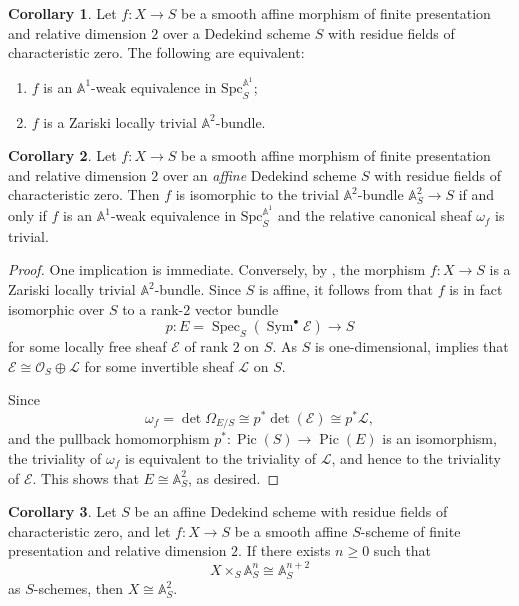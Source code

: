 \documentclass[10pt]{amsart}
\renewcommand{\AA}{\mathbb{A}}
\newcommand{\Spec}{\operatorname{Spec}}
\DeclareMathOperator{\Sym}{Sym}
\numberwithin{equation}{section} %
\theoremstyle{plain}
\theoremstyle{definition}
\newtheorem{corollary}[corollary]{Corollary}
\theoremstyle{remark}
\newcommand{\Pic}{\operatorname{Pic}}
\begin{document}
\begin{corollary}\label{2-dim DD}
Let $f:X\to S$ be a smooth affine morphism of finite presentation and relative dimension $2$ over a Dedekind scheme $S$ with residue fields of characteristic zero. The following are equivalent:
\begin{enumerate}
    \item $f$ is an $\AA^1$-weak equivalence in $\mathrm{Spc}_S^{\AA^1}$;
    \item $f$ is a Zariski locally trivial $\AA^2$-bundle.
\end{enumerate}
\end{corollary}

\begin{corollary}\label{A2unique:DD}
Let $f:X\to S$ be a smooth affine morphism of finite presentation and relative dimension $2$ over an \emph{affine} Dedekind scheme $S$ with residue fields of characteristic zero. Then $f$ is isomorphic to the trivial $\AA^2$-bundle $\AA^2_S\to S$ if and only if $f$ is an $\AA^1$-weak equivalence in $\mathrm{Spc}_S^{\AA^1}$ and the relative canonical sheaf $\omega_f$ is trivial.
\end{corollary}


\begin{proof}
One implication is immediate. Conversely, by , the morphism $f:X\to S$ is a Zariski locally trivial $\AA^2$-bundle. Since $S$ is affine, it follows from \cite[Theorem~4.9]{BCW76} that $f$ is in fact isomorphic over $S$ to a rank-$2$ vector bundle
\[
p:E=\Spec_S(\Sym^{\bullet}\mathcal{E})\to S
\]
for some locally free sheaf $\mathcal{E}$ of rank $2$ on $S$. As $S$ is one-dimensional, \cite[Theorem~1]{SerreModulesprojectifs} implies that $\mathcal{E}\cong \mathcal{O}_S\oplus \mathcal{L}$ for some invertible sheaf $\mathcal{L}$ on $S$.

Since
\[
\omega_f=\det \Omega_{E/S}\cong p^*\det(\mathcal{E})\cong p^*\mathcal{L},
\]
and the pullback homomorphism $p^*:\Pic(S)\to \Pic(E)$ is an isomorphism, the triviality of $\omega_f$ is equivalent to the triviality of $\mathcal{L}$, and hence to the triviality of $\mathcal{E}$. This shows that $E\cong \AA^2_S$, as desired.
\end{proof}

\begin{corollary}\label{cor:cancel-rel-2}
Let $S$ be an affine Dedekind scheme with residue fields of characteristic zero, and let $f:X\to S$ be a smooth affine $S$-scheme of finite presentation and relative dimension $2$. If there exists $n\geq 0$ such that
\[
X\times_S \AA^n_S \cong \AA^{n+2}_S
\]
as $S$-schemes, then $X\cong \AA^2_S$.
\end{corollary}
\end{document}
